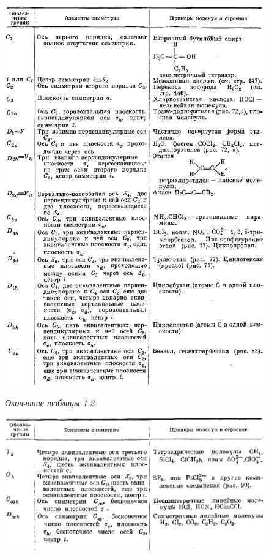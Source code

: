 \begin{figure}[tbp]

\centerline{\hbox{\includegraphics[scale=1]{Ris/ris_eps/tab1_02.eps}}}

\end{figure}

\begin{figure}[tbp]
{\itshape\small\hfill Окончание таблицы 1.2}

\centerline{\hbox{\includegraphics[scale=1]{Ris/ris_eps/tab1_02a.eps}}}


\end{figure}

